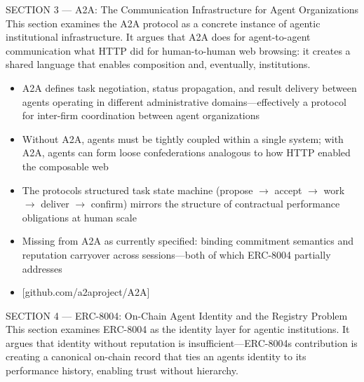 \documentclass[
]{article}
\providecommand{\tightlist}{%
  \setlength{\itemsep}{0pt}\setlength{\parskip}{0pt}}
\begin{document}
SECTION 3 --- A2A: The Communication Infrastructure for Agent
Organizations This section examines the A2A protocol as a concrete
instance of agentic institutional infrastructure. It argues that A2A
does for agent-to-agent communication what HTTP did for human-to-human
web browsing: it creates a shared language that enables composition and,
eventually, institutions.

\begin{itemize}
\tightlist
\item
  A2A defines task negotiation, status propagation, and result delivery
  between agents operating in different administrative
  domains---effectively a protocol for inter-firm coordination between
  agent organizations
\item
  Without A2A, agents must be tightly coupled within a single system;
  with A2A, agents can form loose confederations analogous to how HTTP
  enabled the composable web
\item
  The protocol\textquotesingle s structured task state machine (propose
  $\rightarrow$ accept $\rightarrow$ work $\rightarrow$ deliver $\rightarrow$ confirm) mirrors the structure of
  contractual performance obligations at human scale
\item
  Missing from A2A as currently specified: binding commitment semantics
  and reputation carryover across sessions---both of which ERC-8004
  partially addresses
\item
  {[}github.com/a2aproject/A2A{]}
\end{itemize}

SECTION 4 --- ERC-8004: On-Chain Agent Identity and the Registry Problem
This section examines ERC-8004 as the identity layer for agentic
institutions. It argues that identity without reputation is
insufficient---ERC-8004\textquotesingle s contribution is creating a
canonical on-chain record that ties an agent\textquotesingle s identity
to its performance history, enabling trust without hierarchy.
\end{document}
